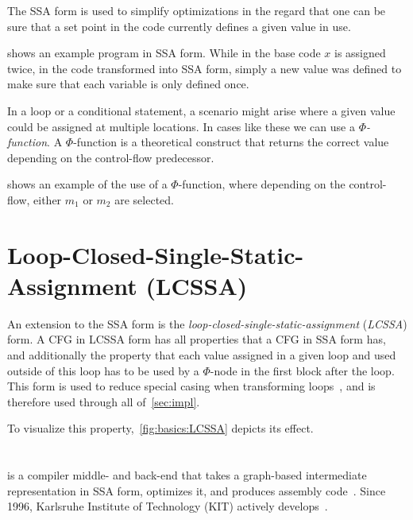 The SSA form is used to simplify optimizations in the regard that one can be sure that a set point in the code currently defines a given value in use.

 shows an example program in SSA form.
While in the base code $x$ is assigned twice, in the code transformed into SSA form, simply a new value was defined to make sure that each variable is only defined once.



In a loop or a conditional statement, a scenario might arise where a given value could be assigned at multiple locations.
In cases like these we can use a \textit{$\Phi$-function}.
A $\Phi$-function is a theoretical construct that returns the correct value depending on the control-flow predecessor.

 shows an example of the use of a $\Phi$-function, where depending on the control-flow, either $m_1$ or $m_2$  are selected.



\section{Loop-Closed-Single-Static-Assignment (LCSSA)}\label{sec:basics:LCSSA}

An extension to the SSA form is the \textit{loop-closed-single-static-assignment} (\textit{LCSSA}) form.
A CFG in LCSSA form has all properties that a CFG in SSA form has, and additionally the property that each value assigned in a given loop and used outside of this loop has to be used by a $\Phi$-node in the first block after the loop.
This form is used to reduce special casing when transforming loops~\cite{aebi18bachelorarbeit}, and is therefore used through all of~\cref{sec:impl}.

To visualize this property,~\cref{fig:basics:LCSSA} depicts its effect.



\section{\libFIRM}\label{sec:basics:firm}

\libFIRM{} is a compiler middle- and back-end that takes a graph-based intermediate representation in SSA form, optimizes it, and produces assembly code~\cite{libfirm}.
Since 1996, Karlsruhe Institute of Technology (KIT) actively develops~\libFIRM.

